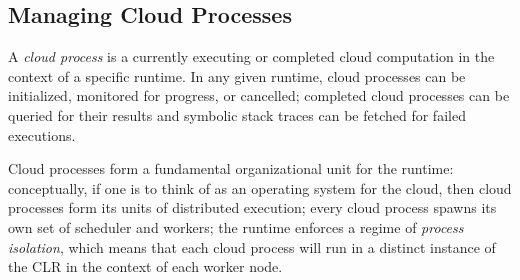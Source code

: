 \subsection{Managing Cloud Processes}

A \emph{cloud process} is a currently executing or completed cloud computation in the context
of a specific \mbrace{} runtime. In any given runtime, cloud processes can be initialized,
monitored for progress, or cancelled; completed cloud processes can be queried for their results
and symbolic stack traces can be fetched for failed executions.

Cloud processes form a fundamental organizational unit for the \mbrace{} runtime:
conceptually, if one is to think of \mbrace{} as an operating system for the cloud,
then cloud processes form its units of distributed execution;
every cloud process spawns its own set of scheduler and workers;
the \mbrace{} runtime enforces a regime of \emph{process isolation},
which means that each cloud process will run in a distinct instance of the CLR in the context
of each worker node.

